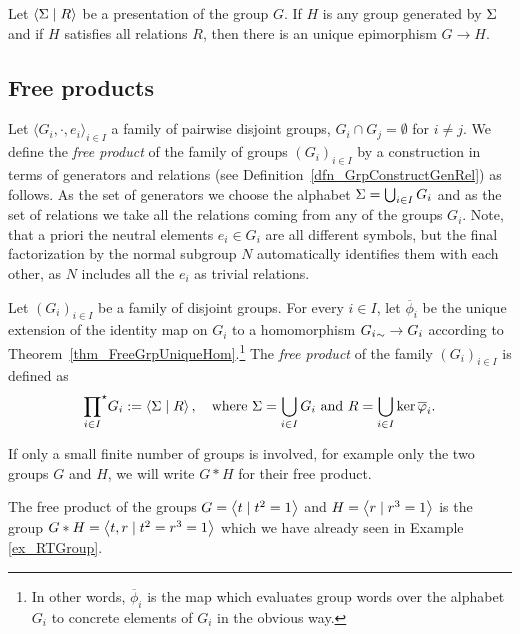 \begin{theorem}
Let $\left\langle \Sigma \mid R \right\rangle$ be a presentation of the group $G$. If $H$ is any group generated by $\Sigma$ and if $H$ satisfies all relations $R$, then there is an unique epimorphism $G \to H$.
\end{theorem}

\subsection{Free products}

Let $\langle G_i, \cdot, e_i \rangle_{i \in I}$ a family of pairwise disjoint groups, \ie $G_i \cap G_j = \emptyset$ for $i \ne j$. We define the \emph{free product} of the family of groups $(G_i)_{i \in I}$ by a construction in terms of generators and relations (see Definition~\ref{dfn_GrpConstructGenRel}) as follows. As the set of generators we choose the alphabet $\Sigma = \bigcup_{i \in I} G_i$ and as the set of relations we take all the relations coming from any of the groups $G_i$. Note, that a priori the neutral elements $e_i \in G_i$ are all different symbols, but the final factorization by the normal subgroup $N$ automatically identifies them with each other, as $N$ includes all the $e_i$ as trivial relations.

\begin{definition}
Let $(G_i)_{i \in I}$ be a family of disjoint groups. For every $i \in I$, let $\overline{\phi}_i$ be the unique extension of the identity map on $G_i$ to a homomorphism ${G_i}_{\sim} \to G_i$ according to Theorem~\ref{thm_FreeGrpUniqueHom}.\footnote{In other words, $\overline{\phi}_i$ is the map which evaluates group words over the alphabet $G_i$ to concrete elements of $G_i$ in the obvious way.} The \emph{free product} of the family $(G_i)_{i \in I}$ is defined as
\begin{equation*}
{\prod_{i \in I}}^{\star} G_i := \left\langle \Sigma \mid R \right\rangle, 
\quad \text{where } \Sigma = \bigcup_{i \in I} G_i \text{ and } R = \bigcup_{i \in I} \ker \overline{\varphi}_i.
\end{equation*} 
\end{definition}

If only a small finite number of groups is involved, for example only the two groups $G$ and $H$, we will write $G \ast H$ for their free product.

\begin{example}
\label{ex_RTFreeProd}
The free product of the groups $G = \left\langle t \mid t^2 = 1 \right\rangle$ and $H = \left\langle r \mid r^3 = 1 \right\rangle$ is the group $G \ast H = \left\langle t,r \mid t^2 = r^3 = 1 \right\rangle$ which we have already seen in Example \ref{ex_RTGroup}.
\end{example}

